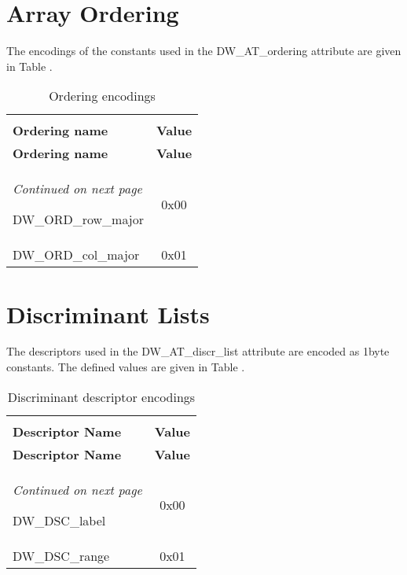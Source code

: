 \clearpage
\section{Array Ordering}
\label{datarep:arrayordering}

The encodings of the constants used in the 
DW\-\_AT\-\_ordering attribute are given in 
Table .

\begin{centering}
\setlength{\extrarowheight}{0.1cm}
\begin{longtable}{l|c}
  \caption{Ordering encodings} \label{tab:orderingencodings}\\
  \hline \\ \bfseries Ordering name&\bfseries Value \\ \hline
\endfirsthead
  \bfseries Ordering name&\bfseries Value\\ \hline
\endhead
  \hline \emph{Continued on next page}
\endfoot
  \hline
\endlastfoot

DW\-\_ORD\-\_row\-\_major&0x00  \\
DW\-\_ORD\-\_col\-\_major&0x01  \\

\end{longtable}
\end{centering}


\section{Discriminant Lists}
\label{datarep:discriminantlists}

The descriptors used in the 
DW\-\_AT\-\_discr\-\_list attribute are 
encoded as 1\dash byte constants. The
defined values are given in 
Table .

\begin{centering}
\setlength{\extrarowheight}{0.1cm}
\begin{longtable}{l|c}
  \caption{Discriminant descriptor encodings} \label{tab:discriminantdescriptorencodings}\\
  \hline \\ \bfseries Descriptor Name&\bfseries Value \\ \hline
\endfirsthead
  \bfseries Descriptor Name&\bfseries Value\\ \hline
\endhead
  \hline \emph{Continued on next page}
\endfoot
  \hline
\endlastfoot

DW\-\_DSC\-\_label&0x00 \\
DW\-\_DSC\-\_range&0x01 \\

\end{longtable}
\end{centering}

